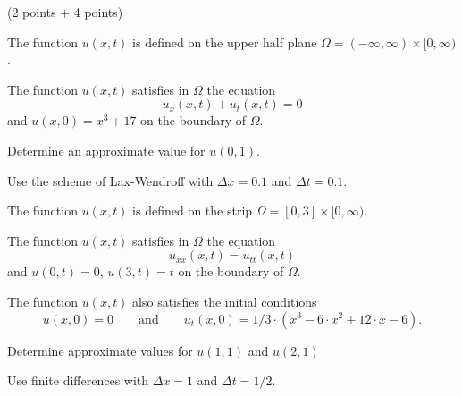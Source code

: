 (2 points + 4 points)
\begin{teilaufgaben}
\item
The function $u(x,t)$ is defined on the upper half plane
$\Omega = (-\infty, \infty) \times [0,\infty)$.

The function $u(x,t)$ satisfies in $\Omega$ the equation
\[
u_{x}(x,t) + u_{t}(x,t) = 0
\]
and $u(x,0) = x^3+17$ on the boundary of $\Omega$. 

Determine an approximate value for $u(0,1)$.

Use the scheme of Lax-Wendroff with $\Delta x = 0.1$ and $\Delta t = 0.1.$

\item
The function $u(x,t)$ is defined on the strip
$\Omega = [0, 3] \times [0,\infty)$.

The function $u(x,t)$ satisfies in $\Omega$ the equation
\[
u_{xx}(x,t) = u_{tt}(x,t)
\]
and  $u(0,t) = 0$, $u(3,t) = t$ on the boundary of $\Omega$. 

The function $u(x,t)$ also satisfies the initial conditions
\[
u(x,0)
=
0
\qquad \text{and} \qquad
u_t(x,0)
=
1/3 \cdot (x^3 - 6 \cdot x^2 + 12 \cdot x - 6).
\]

Determine approximate values for $u(1,1)$ and $u(2,1)$  

Use finite differences with $\Delta x = 1$ and $\Delta t = 1/2.$
\end{teilaufgaben}

